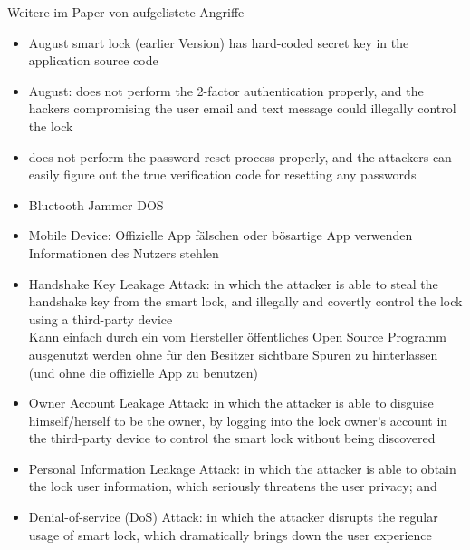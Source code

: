 	Weitere im Paper von \citeauthor{Ye2017} aufgelistete Angriffe
	\begin{itemize}
	    \item August smart lock (earlier Version) has hard-coded secret key in the application source code \cite{Rose2016}
		\item August: does not perform the 2-factor authentication properly, and the hackers compromising the user email and text message could illegally control the lock
		\item does not perform the password reset process properly, and the	attackers can easily figure out the true verification code for resetting any passwords
		\item Bluetooth Jammer \textrightarrow DOS
		\item Mobile Device: Offizielle App fälschen oder bösartige App verwenden \textrightarrow Informationen des Nutzers stehlen \textrightarrow 
		\item Handshake Key Leakage Attack: in which the attacker is able to steal the handshake key from the smart lock, and	illegally and covertly control the lock using a third-party	device\\
		    Kann einfach durch ein vom Hersteller öffentliches Open Source Programm ausgenutzt werden ohne für den Besitzer sichtbare Spuren zu hinterlassen (und ohne die offizielle App zu benutzen)
		\item Owner Account Leakage Attack: in which the attacker is able to disguise himself/herself to be the owner, by logging into the lock owner’s account in the third-party device to control the smart lock without being discovered
		\item Personal Information Leakage Attack: in which the attacker is able to obtain the lock user information, which seriously threatens the user privacy; and
		\item Denial-of-service (DoS) Attack: in which the attacker disrupts the regular usage of smart lock, which dramatically	brings down the user experience
	\end{itemize}